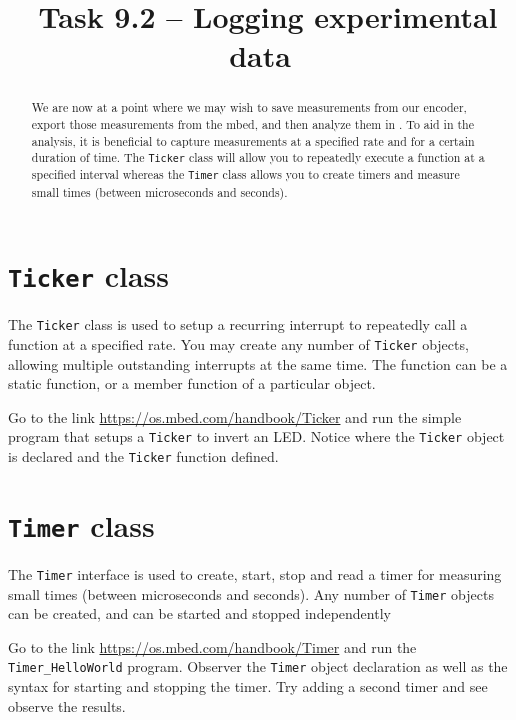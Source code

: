 \documentclass{exam}
\title{\usnaCourseNumber\ Task 9.2 -- Logging experimental data}
\author{\usnaInstructorShort}
\date{\printdate{\courseWeekSeven}}
\begin{document}
\maketitle

\begin{abstract}
We are now at a point where we may wish to save measurements from our encoder, export those measurements from the mbed, and then analyze them in \Matlab.  To aid in the analysis, it is beneficial to capture measurements at a specified rate and for a certain duration of time.  The \lstinline{Ticker} class will allow you to repeatedly execute a function at a specified interval whereas the \lstinline{Timer} class allows you to create timers and measure small times (between microseconds and seconds).                                    
\end{abstract}




\section{\lstinline{Ticker} class}
The \lstinline{Ticker} class is used to setup a recurring interrupt to repeatedly call a function at a specified rate. You may create any number of \lstinline{Ticker} objects, allowing multiple outstanding interrupts at the same time. The function can be a static function, or a member function of a particular object.

Go to the link \url{https://os.mbed.com/handbook/Ticker} and run the simple program that setups a \lstinline{Ticker} to invert an LED.  Notice where the \lstinline{Ticker} object is declared and the \lstinline{Ticker} function defined.  




\section{\lstinline{Timer} class}
The \lstinline{Timer} interface is used to create, start, stop and read a timer for measuring small times (between microseconds and seconds). Any number of \lstinline{Timer} objects can be created, and can be started and stopped independently

Go to the link \url{https://os.mbed.com/handbook/Timer} and run the \lstinline{Timer_HelloWorld} program.  Observer the \lstinline{Timer} object declaration as well as the syntax for starting and stopping the timer.  Try adding a second timer and see observe the results.
\end{document}

